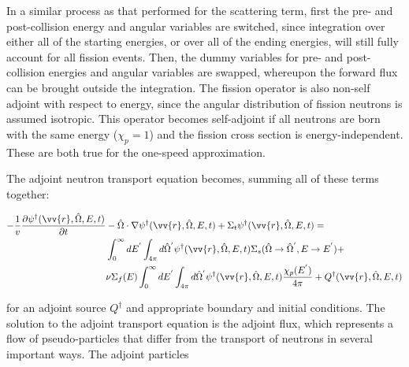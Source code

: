 \documentclass[10pt]{article}
\begin{document}
\begin{flushleft}
\begin{enumerate}
In a similar process as that performed for the scattering term, first the pre- and post-collision energy and angular variables are switched, since integration over either all of the starting energies, or over all of the ending energies, will still fully account for all fission events. Then, the dummy variables for pre- and post-collision energies and angular variables are swapped, whereupon the forward flux can be brought outside the integration. The fission operator is also non-self adjoint with respect to energy, since the angular distribution of fission neutrons is assumed isotropic. This operator becomes self-adjoint if all neutrons are born with the same energy (\(\chi_p=1\)) and the fission cross section is energy-independent. These are both true for the one-speed approximation.
\end{enumerate}

The adjoint neutron transport equation becomes, summing all of these terms together:

\begin{equation} %
\begin{aligned}
-\frac{1}{v}\frac{\partial\psi^\dagger(\vv{r},\hat{\Omega},E,t)}{\partial t}
& -\hat{\Omega}\cdot\nabla\psi^\dagger(\vv{r},\hat{\Omega},E,t)
+\Sigma_t\psi^\dagger(\vv{r},\hat{\Omega},E,t)=\\
& \int_0^\infty dE^{'}\int_{4\pi}d\hat{\Omega}^{'}\psi^\dagger(\vv{r},\hat{\Omega},E,t)\Sigma_s(\hat{\Omega}\rightarrow\hat{\Omega}^{'}, E\rightarrow E^{'})+\\
& \nu\Sigma_f(E)\int_0^\infty dE^{'}\int_{4\pi}d\hat{\Omega}^{'}\psi^\dagger(\vv{r},\hat{\Omega},E,t)\frac{\chi_p(E^{'})}{4\pi} + Q^\dagger(\vv{r},\hat{\Omega},E,t)\\
\end{aligned}
\end{equation}

for an adjoint source \(Q^\dagger\) and appropriate boundary and initial conditions. The solution to the adjoint transport equation is the adjoint flux, which represents a flow of pseudo-particles that differ from the transport of neutrons in several important ways. The adjoint particles


\end{flushleft}
\end{document}
